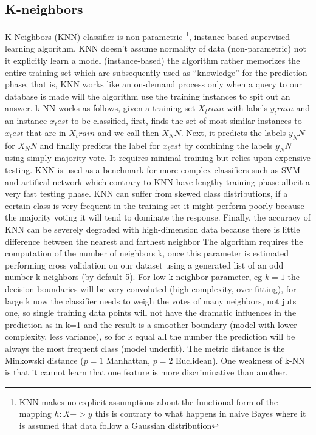 \documentclass[12pt]{report}
\begin{document}
\subsection{K-neighbors}
K-Neighbors (KNN) classifier is non-parametric \footnote{KNN makes no explicit assumptions about the functional form of the mapping $h:X->y$ this is contrary to what happens in naive Bayes where it is assumed that data follow a Gaussian distribution}, instance-based supervised learning algorithm. KNN doesn't assume normality of data (non-parametric) not it explicitly learn a model (instance-based) the algorithm rather memorizes the entire training set which are subsequently used as “knowledge” for the prediction phase, that is, KNN works like an on-demand process only when a query to our database is made will the algorithm use the training instances to spit out an answer. 
k-NN works as follows, given a training set $X_train$ with labels $y_train$ and an instance $x_test$ to be classified, first, finds the set of most similar instances to $x_test$ that are in $X_train$ and we call then $X_NN$. Next, it predicts the labels $y_NN$ for $X_NN$ and finally predicts the label for $x_test$ by combining the labels $y_NN$ using simply majority vote. 
It requires minimal training but relies upon expensive testing. KNN is used as a benchmark for more complex classifiers such as SVM and artifical network which contrary to KNN have lengthy training phase albeit a very fast testing phase. KNN can suffer from skewed class distributions, if a certain class is very frequent in the training set it might perform poorly because the majority voting 
it will tend to dominate the response. Finally, the accuracy of KNN can be severely degraded with high-dimension data because there is little difference between the nearest and farthest neighbor
The algorithm requires the computation of the number of neighbors k, once this parameter is estimated performing cross validation on our dataset using a generated list of an odd number k neighbors (by default 5). For low k neighbor parameter, eg $k=1$ the decision boundaries will be very convoluted (high complexity, over fitting), for large k now the classifier needs to weigh the votes of many neighbors, not juts one, so single training data points will not have the dramatic influences in the prediction as in k=1 and the result is a smoother boundary (model with lower complexity, less variance), so for k equal all the number the prediction will be always the most frequent class (model underfit). The metric distance is the Minkowski distance ($p=1$ Manhattan, $p=2$ Euclidean). 
One weakness of k-NN  is that it cannot learn that one feature is more discriminative than another.
\end{document}
